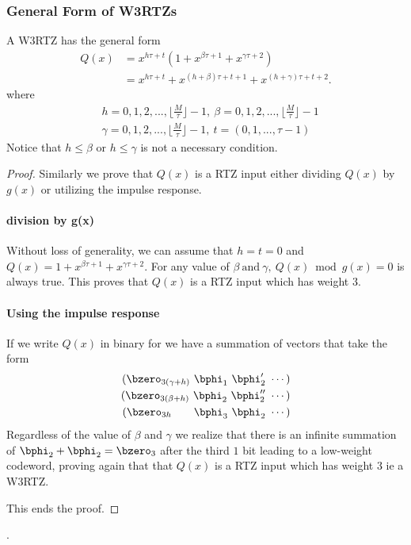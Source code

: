 \subsubsection{General Form of W3RTZs}
A W3RTZ has the general form
\begin{equation}
\begin{split}
Q(x) &=x^{h\tau+t}(1+x^{\beta \tau +1}+x^{\gamma \tau +2})\\
&=x^{h\tau+t}+x^{(h+\beta) \tau +t+1}+x^{(h+\gamma) \tau +t+2}. 
\end{split}
\end{equation}
where
\begin{equation*}
\begin{split}
&h=0,1,2,...,\Big \lfloor \frac{M}{\tau} \Big\rfloor-1,~
\beta=0,1,2,...,\Big \lfloor \frac{M}{\tau} \Big\rfloor-1\\
&\gamma=0,1,2,...,\Big \lfloor \frac{M}{\tau} \Big\rfloor-1,~
 t=(0,1,...,\tau-1)
 \end{split}
 \end{equation*}
Notice that $h \leq \beta$ or $h \leq \gamma$ is not a necessary condition.
	
\begin{proof}
Similarly we prove that $Q(x)$ is a RTZ input either dividing $Q(x)$ by $g(x)$ or utilizing the impulse response. 
\paragraph{division by g(x)}
Without loss of generality, we can assume that $h=t=0$ and 
$Q(x) = 1+x^{\beta \tau +1}+x^{\gamma \tau +2}$.
For any value of $\beta~\text{and}~\gamma,~Q(x) \bmod g(x) = 0$ is always true. This proves that $Q(x)$ is a RTZ input which has weight $3$.

\paragraph{Using the impulse response}
If we write $Q(x)$ in binary for we have a summation of vectors that take the form
\begin{eqnarray*}
(\bzero_{3(\gamma+h)}~\bphi_1~\bphi'_2~\cdots)\cr
(\bzero_{3(\beta+h)}~\bphi_2~\bphi''_2~\cdots)\cr
(\bzero_{3 h}~~~~~~\bphi_3~\bphi_2~\cdots)
\end{eqnarray*}
Regardless of the value of $\beta$ and $\gamma$ we realize that there is an infinite summation of $\bphi_2+\bphi_2=\bzero_3$ after the third $1$ bit leading to a low-weight codeword, proving again that that $Q(x)$ is a RTZ input which has weight $3$ ie a W3RTZ.

This ends the proof.

\end{proof}.

